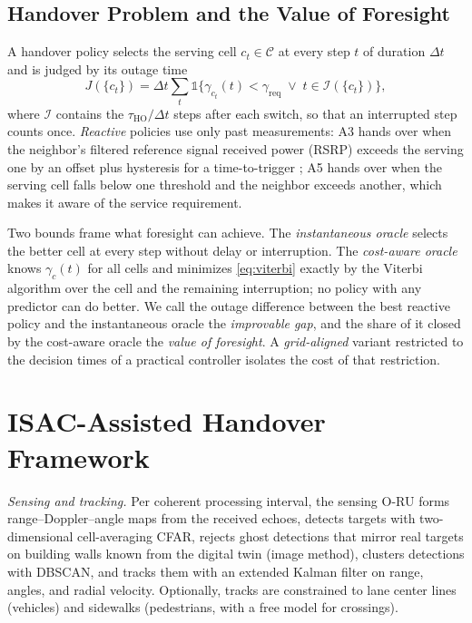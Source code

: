 \documentclass[conference]{IEEEtran}
\begin{document}
\subsection{Handover Problem and the Value of Foresight}
A handover policy selects the serving cell $c_t\in\mathcal{C}$ at every
step $t$ of duration $\Delta t$ and is judged by its outage time
\begin{equation}
J(\{c_t\})=\Delta t\sum_t \mathbb{1}\bigl\{\gamma_{c_t}(t)<\gamma_{\mathrm{req}}
\;\lor\; t\in\mathcal{I}(\{c_t\})\bigr\},
\label{eq:viterbi}
\end{equation}
where $\mathcal{I}$ contains the $\tau_{\mathrm{HO}}/\Delta t$ steps
after each switch, so that an interrupted step counts once.
\emph{Reactive} policies use only past measurements: A3 hands over when
the neighbor's filtered reference signal received power (RSRP) exceeds
the serving one by an offset plus hysteresis for a time-to-trigger
\cite{3gpp38331}; A5 hands over when the serving cell falls below one
threshold and the neighbor exceeds another, which makes it aware of the
service requirement.

Two bounds frame what foresight can achieve. The \emph{instantaneous
oracle} selects the better cell at every step without delay or
interruption. The \emph{cost-aware oracle} knows $\gamma_c(t)$ for all
cells and minimizes \eqref{eq:viterbi} exactly by the Viterbi algorithm
over the cell and the remaining interruption; no policy with any
predictor can do better. We call the outage difference between the best
reactive policy and the instantaneous oracle the \emph{improvable gap},
and the share of it closed by the cost-aware oracle the \emph{value of
foresight}. A \emph{grid-aligned} variant restricted to the decision
times of a practical controller isolates the cost of that restriction.

\section{ISAC-Assisted Handover Framework}
\textit{Sensing and tracking.} Per coherent processing interval, the
sensing O-RU forms range--Doppler--angle maps from the received echoes,
detects targets with two-dimensional cell-averaging CFAR, rejects ghost
detections that mirror real targets on building walls known from the
digital twin (image method), clusters detections with DBSCAN, and tracks
them with an extended Kalman filter on range, angles, and radial
velocity. Optionally, tracks are constrained to lane center lines
(vehicles) and sidewalks (pedestrians, with a free model for crossings).
\end{document}
